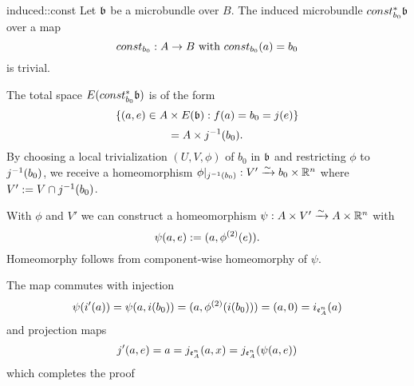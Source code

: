 \begin{mylemma}{induced::const}
    Let $\mathfrak{b}$ be a microbundle over $B$. The induced microbundle $const_{b_0}^*\mathfrak{b}$ over a map
    \[ const_{b_0}: A \to B \text{ with } const_{b_0}(a) = b_0 \]
    is trivial.
\end{mylemma}

\begin{myproof}
    The total space $E(const_{b_0}^*\mathfrak{b})$ is of the form
    \[ \{(a, e) \in A \times E(\mathfrak{b}):f(a) = b_0 = j(e)\} \]
    \[ = A \times j^{-1}(b_0). \]
    By choosing a local trivialization $(U, V, \phi)$ of $b_0$ in $\mathfrak{b}$ and restricting $\phi$ to $j^{-1}(b_0)$,
    we receive a homeomorphism $\phi\vert_{j^{-1}(b_0)}: V' \xrightarrow{\sim} b_0 \times \mathbb{R}^n$ where $V' := V \cap j^{-1}(b_0)$.
    
    With $\phi$ and $V'$ we can construct a homeomorphism $\psi: A \times V' \xrightarrow{\sim} A \times \mathbb{R}^n$ with
    \[ \psi(a, e) := (a, \phi^{(2)}(e)). \]
    Homeomorphy follows from component-wise homeomorphy of $\psi$.

    The map commutes with injection
    \[ \psi(i'(a)) = \psi(a, i(b_0)) = (a, \phi^{(2)}(i(b_0))) = (a, 0) = i_{\mathfrak{e}^{n}_{A}}(a) \]
    and projection maps
    \[ j'(a, e) = a = j_{\mathfrak{e}^{n}_{A}}(a, x) = j_{\mathfrak{e}^{n}_{A}}(\psi(a, e)) \]
    which completes the proof
\end{myproof}